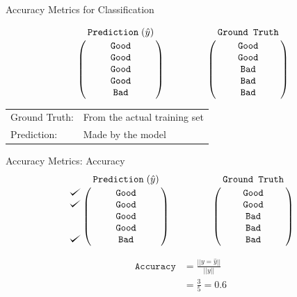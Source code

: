 \documentclass[usenames,dvipsnames]{beamer}
\def\checkmark{\tikz\fill[scale=0.4](0,.35) -- (.25,0) -- (1,.7) -- (.25,.15) -- cycle;}
\newcommand{\DoTikzmark}[1]{%
	\tikz[remember picture] \coordinate[shift={(0,.7ex)}](#1);%
}
\begin{document}
%
%





\begin{frame}{Accuracy Metrics for Classification}



$$\bordermatrix{&\texttt{Prediction}\;(\hat{y})\cr
                &\texttt{Good}\cr
                &\texttt{Good}\cr
                &\texttt{Good}\cr
                &\texttt{Good}\cr
                &\texttt{Bad}}
                \qquad \qquad
   \bordermatrix{&\texttt{Ground Truth}\cr
                &\texttt{Good}\cr
                &\texttt{Good}\cr
                &\texttt{Bad}\cr
                &\texttt{Bad}\cr
                &\texttt{Bad}}
$$

\vspace{1cm}

\begin{tabular}{ll}
Ground Truth: & From the actual training set \\ 
Prediction: & Made by the model \\ 
\end{tabular}

\end{frame}

\begin{frame}{Accuracy Metrics: Accuracy}
$$
\bordermatrix{&\texttt{Prediction}\;(\hat{y})\cr
               \checkmark&\texttt{Good}\cr
               \checkmark&\texttt{Good}\cr
                &\texttt{Good}\cr
                &\texttt{Good}\cr
               \checkmark&\texttt{Bad}}
\qquad \qquad
\bordermatrix{&\texttt{Ground Truth}\cr
                &\texttt{Good}\cr
                &\texttt{Good}\cr
                &\texttt{Bad}\cr
                &\texttt{Bad}\cr
                &\texttt{Bad}}
$$

\begin{align*}
\texttt{Accuracy} &= \frac{||y = \hat{y}||}{||y||} \\
&= \frac{3}{5} = 0.6
\end{align*}

\end{frame}
\end{document}
